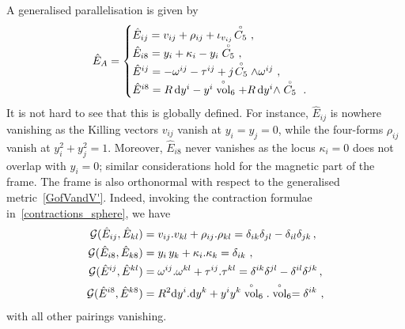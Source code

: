 \documentclass[debug]{phd}
\begin{document}
					A generalised parallelisation is given by
							\begin{equation}\label{s6frame}
								\hat{E}_{A} = \begin{cases}
											\hat{E}_{ij} = v_{ij} + \rho_{ij} + \iota_{v_{ij}}\!\stackrel{\scriptscriptstyle{\circ}}{C_5}\ , \\
											\hat{E}_{i8} = y_i + \kappa_i - y_i \stackrel{\scriptscriptstyle{\circ}}{C_5}\ , \\
											\hat{E}^{ij} = -\omega^{ij} - \tau^{ij} + j \!\stackrel{\scriptscriptstyle{\circ}}{C_5} \wedge \omega^{ij}\ , \\
											\hat{E}^{i8} = R\,\mathrm{d} y^i - y^i \stackrel{\scriptscriptstyle{\circ}}{\rm vol}_6 + R\,\mathrm{d} y^i \wedge \stackrel{\scriptscriptstyle{\circ}}{C_5} \ .
										\end{cases}
							\end{equation}
					It is not hard to see that this is globally defined. 
					For instance, $\hat{E}_{ij}$ is nowhere vanishing as the Killing vectors $v_{ij}$ vanish at $y_i = y_j =0$, while the four-forms $\rho_{ij}$ vanish at $y_i^2+y_j^2=1$. 
					Moreover, $\hat{E}_{i8}$ never vanishes as the locus $\kappa_i = 0$ does not overlap with $y_i =0$; similar considerations hold for the magnetic part of the frame.
					The frame is also orthonormal with respect to the generalised metric~\eqref{GofVandV'}. 
					Indeed, invoking the contraction formulae in~\eqref{contractions_sphere}, we have
							\begin{equation}
								\begin{split}
									\mathcal{G}(\hat{E}_{ij} , \hat{E}_{kl}) &= v_{ij}. v_{kl} + \rho_{ij} . \rho_{kl} = \delta_{ik}\delta_{jl} - \delta_{il}\delta_{jk} \, , \\
									\mathcal{G}(\hat{E}_{i8} , \hat{E}_{k8}) &= y_i \, y_k + \kappa_i. \kappa_k = \delta_{ik}\ , \\
									\mathcal{G}(\hat{E}^{ij} , \hat{E}^{kl}) &= \omega^{ij}. \omega^{kl} + \tau^{ij} . \tau^{kl} = \delta^{ik}\delta^{jl} - \delta^{il}\delta^{jk} \, , \\
									\mathcal{G}(\hat{E}^{i8} , \hat{E}^{k8}) &= R^2 \mathrm{d} y^i .\mathrm{d} y^k + y^iy^k \stackrel{\scriptscriptstyle{\circ}}{\operatorname{vol}}_6. \stackrel{\scriptscriptstyle{\circ}}{\operatorname{vol}}_6 = \delta^{ik} \ ,
								\end{split}
							\end{equation}
					with all other pairings vanishing.
\end{document}
